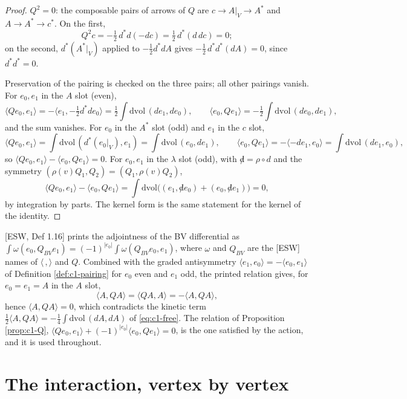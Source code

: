 \begin{proof}
$Q^2=0$: the composable pairs of arrows of $Q$ are $c\to A|_V\to A^*$ and $A\to A^*\to c^*$. On the first,
\[
Q^2c=-\tfrac12\,d^*d(-dc)=\tfrac12\,d^*(d\,dc)=0 ;
\]
on the second, $d^*(A^*|_V)$ applied to $-\tfrac12d^*dA$ gives $-\tfrac12\,d^*d^*(dA)=0$, since $d^*d^*=0$.

Preservation of the pairing is checked on the three pairs; all other pairings vanish. For $e_0,e_1$ in the $A$ slot (even),
\[
\langle Qe_0,e_1\rangle=-\langle e_1,-\tfrac12d^*de_0\rangle=\tfrac12\int\mathrm{dvol}\,(de_1,de_0),\qquad \langle e_0,Qe_1\rangle=-\tfrac12\int\mathrm{dvol}\,(de_0,de_1),
\]
and the sum vanishes. For $e_0$ in the $A^*$ slot (odd) and $e_1$ in the $c$ slot,
\[
\langle Qe_0,e_1\rangle=\int\mathrm{dvol}\,(d^*(e_0|_V),e_1)=\int\mathrm{dvol}\,(e_0,de_1),\qquad \langle e_0,Qe_1\rangle=-\langle -de_1,e_0\rangle=\int\mathrm{dvol}\,(de_1,e_0),
\]
so $\langle Qe_0,e_1\rangle-\langle e_0,Qe_1\rangle=0$. For $e_0,e_1$ in the $\lambda$ slot (odd), with ${\not d}=\rho\circ d$ and the symmetry $(\rho(v)Q_1,Q_2)=(Q_1,\rho(v)Q_2)$,
\[
\langle Qe_0,e_1\rangle-\langle e_0,Qe_1\rangle=\int\mathrm{dvol}\big((e_1,{\not d}e_0)+(e_0,{\not d}e_1)\big)=0,
\]
by integration by parts. The kernel form is the same statement for the kernel of the identity.
\end{proof}

\begin{remark}
\label{rem:c1-adjoint}
[ESW, Def 1.16] prints the adjointness of the BV differential as $\int\omega(e_0,Q_{BV}e_1)=(-1)^{|e_0|}\int\omega(Q_{BV}e_0,e_1)$, where $\omega$ and $Q_{BV}$ are the [ESW] names of $\langle\,,\rangle$ and $Q$. Combined with the graded antisymmetry $\langle e_1,e_0\rangle=-\langle e_0,e_1\rangle$ of Definition \ref{def:c1-pairing} for $e_0$ even and $e_1$ odd, the printed relation gives, for $e_0=e_1=A$ in the $A$ slot,
\[
\langle A,QA\rangle=\langle QA,A\rangle=-\langle A,QA\rangle,
\]
hence $\langle A,QA\rangle=0$, which contradicts the kinetic term $\tfrac12\langle A,QA\rangle=-\tfrac14\int\mathrm{dvol}\,(dA,dA)$ of \eqref{eq:c1-free}. The relation of Proposition \ref{prop:c1-Q}, $\langle Qe_0,e_1\rangle+(-1)^{|e_0|}\langle e_0,Qe_1\rangle=0$, is the one satisfied by the action, and it is used throughout.
\end{remark}

\section{The interaction, vertex by vertex}

